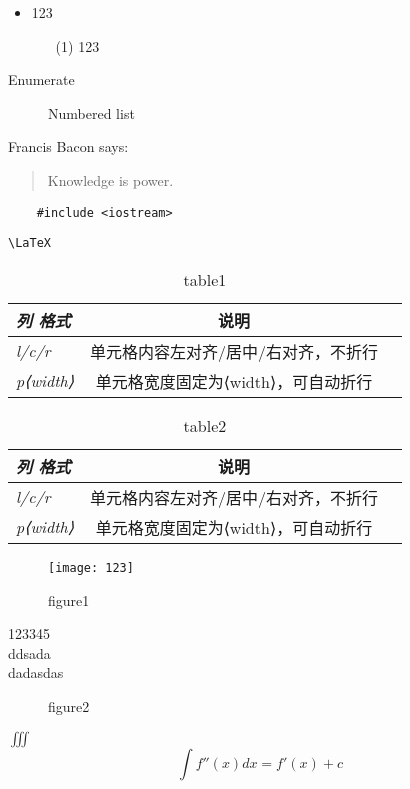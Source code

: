 		\begin{itemize}
			\item 123
			\begin{itemize}
				\item[(1)] 123
			\end{itemize}
		\end{itemize}
	\begin{description}
		\item[Enumerate] Numbered list
	\end{description}

Francis Bacon says:
\begin{quotation}
	Knowledge is power.
\end{quotation}
\begin{verbatim}
	#include <iostream>
\end{verbatim}
\verb|\LaTeX|

\begin{table}[htbp]
	\begin{tabular}{>{\itshape}l<{}|cc}
		\hline 
		列 格式      &    说明&\\
		\hline
		l/c/r       &   单元格内容左对齐/居中/右对齐，不折行&\\
		\cline{2-3}
		p{⟨width⟩}  &   单元格宽度固定为⟨width⟩，可自动折行&\\
		\hline
	\end{tabular}
	\caption{table1}\label{表格1}
\end{table}

\begin{table}[htbp]
	\begin{flushright}
		\begin{tabular}{>{\itshape}l<{}cc}
			\toprule
			列 格式      &    说明&\\
			\midrule
			l/c/r       &   单元格内容左对齐/居中/右对齐，不折行&\\
			p{⟨width⟩}  &   单元格宽度固定为⟨width⟩，可自动折行&\\
			\bottomrule
		\end{tabular}
		\caption{table2}
	\end{flushright}
\end{table}


\begin{figure}[htbp]
	\centering
		\texttt{[image: 123]}	
	\caption{figure1}
\end{figure}

123345\\ddsada\\
dadasdas\\

\begin{figure}[htbp]
	\centering
	\subfloat[12321]{\texttt{[image: 123]}}	
	\subfloat[32123]{\texttt{[image: 123]}}	
	\caption{figure2}
\end{figure}

$ \iiint $
\begin{equation}
	\int f''(x) dx = f'(x) + c
\end{equation}